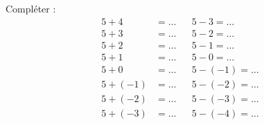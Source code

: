 
\begin{rituel}
    Compléter :
    \begin{subequations}
        \begin{align}
            5+4&=\ldots   && 5-3=\ldots\\
            5+3&=\ldots &&5-2=\ldots\\
            5+2&=\ldots &&5-1=\ldots\\
            5+1&=\ldots && 5-0=\ldots\\
            5+0&=\ldots && 5-(-1)=\ldots\\
            5+(-1)&=\ldots  && 5-(-2)=\ldots\\
            5+(-2)&=\ldots  && 5-(-3)=\ldots\\
            5+(-3)&=\ldots  &&5- (-4)=\ldots
        \end{align}
    \end{subequations}
\end{rituel}
